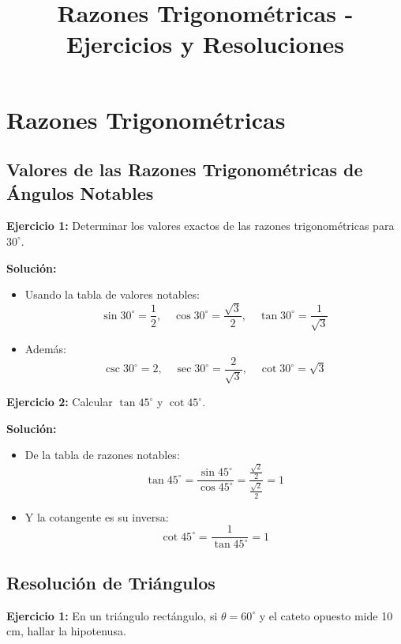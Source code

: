 \documentclass{profesor}
\title{Razones Trigonométricas - Ejercicios y Resoluciones}
\begin{document}
\maketitle
\tableofcontents
\newpage

\section{Razones Trigonométricas}

\subsection{Valores de las Razones Trigonométricas de Ángulos Notables}

\textbf{Ejercicio 1:}  
Determinar los valores exactos de las razones trigonométricas para \( 30^\circ \).

\textbf{Solución:}  
\begin{itemize}
    \item Usando la tabla de valores notables:
    \[
    \sin 30^\circ = \frac{1}{2}, \quad \cos 30^\circ = \frac{\sqrt{3}}{2}, \quad \tan 30^\circ = \frac{1}{\sqrt{3}}
    \]
    \item Además:
    \[
    \csc 30^\circ = 2, \quad \sec 30^\circ = \frac{2}{\sqrt{3}}, \quad \cot 30^\circ = \sqrt{3}
    \]
\end{itemize}

\textbf{Ejercicio 2:}  
Calcular \( \tan 45^\circ \) y \( \cot 45^\circ \).

\textbf{Solución:}  
\begin{itemize}
    \item De la tabla de razones notables:
    \[
    \tan 45^\circ = \frac{\sin 45^\circ}{\cos 45^\circ} = \frac{\frac{\sqrt{2}}{2}}{\frac{\sqrt{2}}{2}} = 1
    \]
    \item Y la cotangente es su inversa:
    \[
    \cot 45^\circ = \frac{1}{\tan 45^\circ} = 1
    \]
\end{itemize}

\newpage
\subsection{Resolución de Triángulos}

\textbf{Ejercicio 1:}  
En un triángulo rectángulo, si \( \theta = 60^\circ \) y el cateto opuesto mide 10 cm, hallar la hipotenusa.
\end{document}
